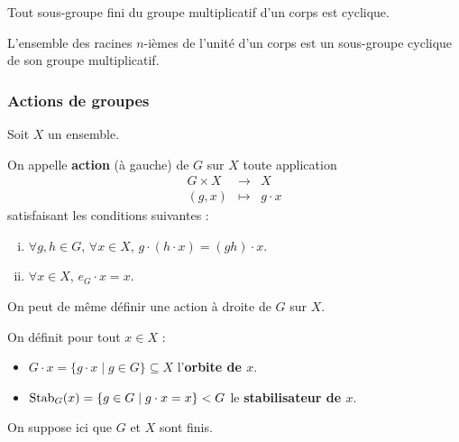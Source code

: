 	
	\begin{theorem}
		Tout sous-groupe fini du groupe multiplicatif d'un corps est cyclique.
	\end{theorem}
	
	\begin{corollary}
		L'ensemble des racines $n$-ièmes de l'unité d'un corps est un sous-groupe cyclique de son groupe multiplicatif.
	\end{corollary}
	
	\subsubsection{Actions de groupes}
	
	
	Soit $X$ un ensemble.
	
	\begin{definition}
		On appelle \textbf{action} (à gauche) de $G$ sur $X$ toute application
		\[
		\begin{array}{ccc}
			G \times X &\rightarrow& X \\
			(g, x) &\mapsto& g \cdot x
		\end{array}
		\]
		satisfaisant les conditions suivantes :
		\begin{enumerate}[(i)]
			\item $\forall g, h \in G$, $\forall x \in X$, $g \cdot (h \cdot x) = (gh) \cdot x$.
			\item $\forall x \in X$, $e_G \cdot x = x$.
		\end{enumerate}
	\end{definition}
	
	\begin{remark}
		On peut de même définir une action à droite de $G$ sur $X$.
	\end{remark}
	
	\begin{definition}
		On définit pour tout $x \in X$ :
		\begin{itemize}
			\item $G \cdot x = \{ g \cdot x \mid g \in G \} \subseteq X$ l'\textbf{orbite de $x$}.
			\item $\operatorname{Stab}_G(x) = \{ g \in G \mid g \cdot x = x \} < G$ le \textbf{stabilisateur de $x$}.
		\end{itemize}
	\end{definition}
	
	On suppose ici que $G$ et $X$ sont finis.
	
